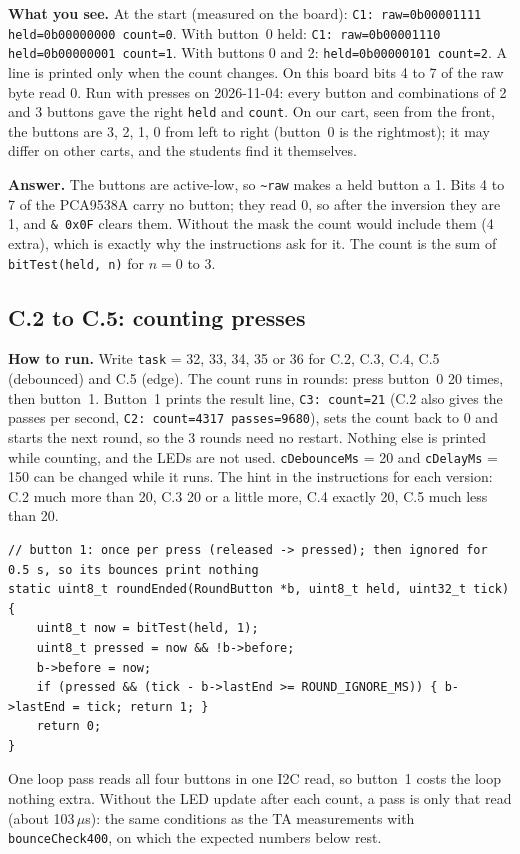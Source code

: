 \documentclass[11pt,a4paper]{article}
\newcommand{\lv}[1]{\texttt{#1}}                 %
\newcommand{\run}[1]{\textbf{How to run.} #1}
\newcommand{\see}[1]{\textbf{What you see.} #1}
\begin{document}
\see{At the start (measured on the board): \texttt{C1: raw=0b00001111 held=0b00000000 count=0}. With button~0
held: \texttt{C1: raw=0b00001110 held=0b00000001 count=1}. With buttons 0 and 2: \texttt{held=0b00000101 count=2}. A
line is printed only when the count changes. On this board bits 4 to 7 of the raw byte read 0.
Run with presses on 2026-11-04: every button and combinations of 2 and 3 buttons gave the right \texttt{held} and
\texttt{count}. On our cart, seen from the front, the buttons are 3, 2, 1, 0 from left to right (button~0 is the
rightmost); it may differ on other carts, and the students find it themselves.}

\textbf{Answer.} The buttons are active-low, so \texttt{\textasciitilde raw} makes a held button a 1. Bits 4 to 7 of
the PCA9538A carry no button; they read 0, so after the inversion they are 1, and \texttt{\& 0x0F} clears them.
Without the mask the count would include them (4 extra), which is exactly why the instructions ask for it. The count is
the sum of \texttt{bitTest(held, n)} for $n = 0$ to 3.

\subsection*{C.2 to C.5: counting presses}
\run{Write \lv{task} = 32, 33, 34, 35 or 36 for C.2, C.3, C.4, C.5 (debounced) and C.5 (edge). The count runs in
rounds: press button~0 20 times, then button~1. Button~1 prints the result line, \texttt{C3: count=21} (C.2 also gives
the passes per second, \texttt{C2: count=4317 passes=9680}), sets the count back to 0 and starts the next round, so the
3 rounds need no restart. Nothing else is printed while counting, and the LEDs are not used. \lv{cDebounceMs} = 20 and
\lv{cDelayMs} = 150 can be changed while it runs. The hint in the instructions for each version: C.2 much more than
20, C.3 20 or a little more, C.4 exactly 20, C.5 much less than 20.}

\begin{lstlisting}
// button 1: once per press (released -> pressed); then ignored for 0.5 s, so its bounces print nothing
static uint8_t roundEnded(RoundButton *b, uint8_t held, uint32_t tick)
{
    uint8_t now = bitTest(held, 1);
    uint8_t pressed = now && !b->before;
    b->before = now;
    if (pressed && (tick - b->lastEnd >= ROUND_IGNORE_MS)) { b->lastEnd = tick; return 1; }
    return 0;
}
\end{lstlisting}
One loop pass reads all four buttons in one I2C read, so button~1 costs the loop nothing extra. Without the LED
update after each count, a pass is only that read (about 103\,$\mu$s): the same conditions as the TA measurements with
\texttt{bounceCheck400}, on which the expected numbers below rest.
\end{document}
